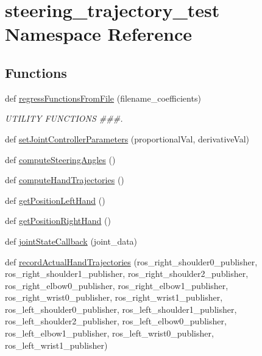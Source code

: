\hypertarget{namespacesteering__trajectory__test}{}\section{steering\+\_\+trajectory\+\_\+test Namespace Reference}
\label{namespacesteering__trajectory__test}
\subsection*{Functions}
\begin{DoxyCompactItemize}
\item 
def \mbox{\hyperlink{namespacesteering__trajectory__test_a7bf4406bcb8f3fedc1533451fcb66279}{regress\+Functions\+From\+File}} (filename\+\_\+coefficients)
\begin{DoxyCompactList}\small\item\em U\+T\+I\+L\+I\+TY F\+U\+N\+C\+T\+I\+O\+NS \#\#\#. \end{DoxyCompactList}\item 
def \mbox{\hyperlink{namespacesteering__trajectory__test_aedabfc5d58c9056cc66ef74c5a240b90}{set\+Joint\+Controller\+Parameters}} (proportional\+Val, derivative\+Val)
\item 
def \mbox{\hyperlink{namespacesteering__trajectory__test_ae6e7f1d8a0658c3dd800f5529104bb8d}{compute\+Steering\+Angles}} ()
\item 
def \mbox{\hyperlink{namespacesteering__trajectory__test_a0e80a2f8f36f677d6d69214a4857fe27}{compute\+Hand\+Trajectories}} ()
\item 
def \mbox{\hyperlink{namespacesteering__trajectory__test_a07c836b044feb3dc4425ef5da3324cf2}{get\+Position\+Left\+Hand}} ()
\item 
def \mbox{\hyperlink{namespacesteering__trajectory__test_a914c0cfe392d15b5831d4c6caf779522}{get\+Position\+Right\+Hand}} ()
\item 
def \mbox{\hyperlink{namespacesteering__trajectory__test_a6a6384a302246f447ba5bc5ece007961}{joint\+State\+Callback}} (joint\+\_\+data)
\item 
def \mbox{\hyperlink{namespacesteering__trajectory__test_a74f9ef301e8dff3fd088529eca18d365}{record\+Actual\+Hand\+Trajectories}} (ros\+\_\+right\+\_\+shoulder0\+\_\+publisher, ros\+\_\+right\+\_\+shoulder1\+\_\+publisher, ros\+\_\+right\+\_\+shoulder2\+\_\+publisher, ros\+\_\+right\+\_\+elbow0\+\_\+publisher, ros\+\_\+right\+\_\+elbow1\+\_\+publisher, ros\+\_\+right\+\_\+wrist0\+\_\+publisher, ros\+\_\+right\+\_\+wrist1\+\_\+publisher, ros\+\_\+left\+\_\+shoulder0\+\_\+publisher, ros\+\_\+left\+\_\+shoulder1\+\_\+publisher, ros\+\_\+left\+\_\+shoulder2\+\_\+publisher, ros\+\_\+left\+\_\+elbow0\+\_\+publisher, ros\+\_\+left\+\_\+elbow1\+\_\+publisher, ros\+\_\+left\+\_\+wrist0\+\_\+publisher, ros\+\_\+left\+\_\+wrist1\+\_\+publisher)

\end{DoxyCompactItemize}
